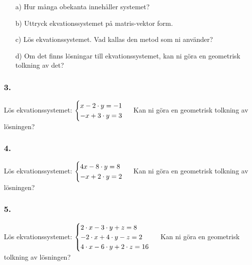 \documentclass{article}
\begin{document}
\begin{itemize}
\item[a) ] Hur många obekanta innehåller systemet?
\item[b) ] Uttryck ekvationssystemet på matris-vektor form.
\item[c) ] Lös ekvationssystemet. Vad kallas den metod som ni använder?
\item[d) ] Om det finns lösningar till ekvationssystemet, kan ni göra en geometrisk tolkning av det?
\end{itemize}

\subsubsection*{3.}
Lös ekvationssystemet: 
\begin{math}
	\begin{cases}
	x - 2 \cdot y = -1 \\
	-x + 3 \cdot y = 3 \\
	\end{cases}
	\\
	\\
\end{math}
Kan ni göra en geometrisk tolkning av lösningen?


\subsubsection*{4.}
Lös ekvationssystemet: 
\begin{math}
	\begin{cases}
	4x - 8 \cdot y = 8 \\
	-x + 2 \cdot y = 2 \\
	\end{cases}
	\\
	\\
\end{math}
Kan ni göra en geometrisk tolkning av lösningen?

\subsubsection*{5.}
Lös ekvationssystemet: 
\begin{math}
	\begin{cases}
	2 \cdot x - 3 \cdot y  + z = 8 \\
	-2 \cdot x + 4 \cdot y -z = 2 \\
	4 \cdot x - 6 \cdot y  + 2 \cdot z = 16 \\
	\end{cases}
	\\
	\\
\end{math}
Kan ni göra en geometrisk tolkning av lösningen?
\end{document}
